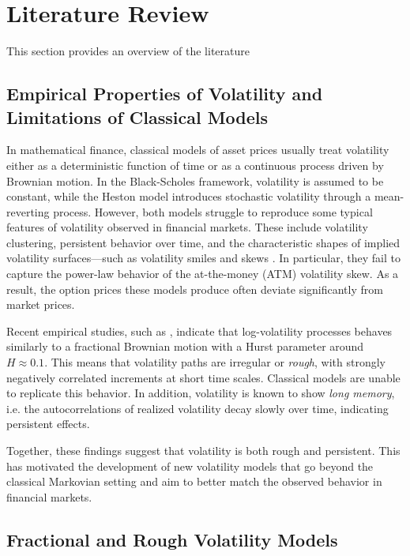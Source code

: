 \section{Literature Review} \label{sec: Literature Review}

This section provides an overview of the literature


\subsection{Empirical Properties of Volatility and Limitations of Classical Models} \label{subsec: Empirical Properties of Volatility}

In mathematical finance, classical models of asset prices usually treat volatility either as a deterministic function of time or as a continuous process driven by Brownian motion. In the Black-Scholes framework, volatility is assumed to be constant, while the Heston model \citep{Heston1993} introduces stochastic volatility through a mean-reverting process. However, both models struggle to reproduce some typical features of volatility observed in financial markets. These include volatility clustering, persistent behavior over time, and the characteristic shapes of implied volatility surfaces—such as volatility smiles and skews \citep{Rubinstein1985}. In particular, they fail to capture the power-law behavior of the at-the-money (ATM) volatility skew. As a result, the option prices these models produce often deviate significantly from market prices.

Recent empirical studies, such as \citet{GatheralJaissonRosenbaum2018}, indicate that log-volatility processes behaves similarly to a fractional Brownian motion with a Hurst parameter around $H \approx 0.1$. This means that volatility paths are irregular or \emph{rough}, with strongly negatively correlated increments at short time scales. Classical models are unable to replicate this behavior. In addition, volatility is known to show \emph{long memory}, i.e. the autocorrelations of realized volatility decay slowly over time, indicating persistent effects.

Together, these findings suggest that volatility is both rough and persistent. This has motivated the development of new volatility models that go beyond the classical Markovian setting and aim to better match the observed behavior in financial markets.



\subsection{Fractional and Rough Volatility Models} \label{subsec: Fractional and Rough Volatility Models}

